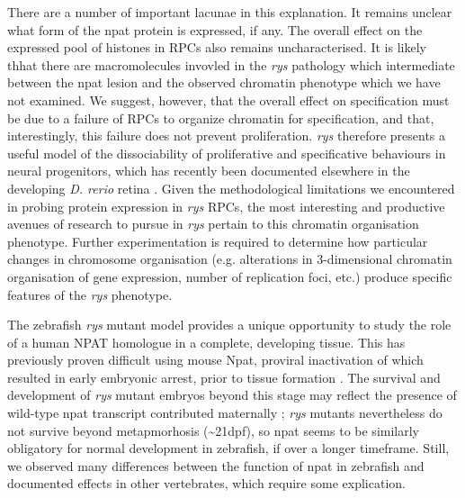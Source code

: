 There are a number of important lacunae in this explanation. It remains unclear what form of the npat protein is expressed, if any. The overall effect on the expressed pool of histones in RPCs also remains uncharacterised. It is likely thhat there are macromolecules invovled in the \textit{rys} pathology which intermediate between the npat lesion and the observed chromatin phenotype which we have not examined. We suggest, however, that the overall effect on specification must be due to a failure of RPCs to organize chromatin for specification, and that, interestingly, this failure does not prevent proliferation. \textit{rys} therefore presents a useful model of the dissociability of proliferative and specificative behaviours in neural progenitors, which has recently been documented elsewhere in the developing \textit{D. rerio} retina \cite{Engerer2017}. Given the methodological limitations we encountered in probing protein expression in \textit{rys} RPCs, the most interesting and productive avenues of research to pursue in \textit{rys} pertain to this chromatin organisation phenotype.  Further experimentation is required to determine how particular changes in chromosome organisation (e.g. alterations in 3-dimensional chromatin organisation of gene expression, number of replication foci, etc.) produce specific features of the \textit{rys} phenotype. 

The zebrafish \textit{rys} mutant model provides a unique opportunity to study the role of a human NPAT homologue in a complete, developing tissue. This has previously proven difficult using mouse Npat, proviral inactivation of which resulted in early embryonic arrest, prior to tissue formation \cite{DiFruscio1997}. The survival and development of \textit{rys} mutant embryos beyond this stage may reflect the presence of wild-type npat transcript contributed maternally \cite{Harvey2013}; \textit{rys} mutants nevertheless do not survive beyond metapmorhosis (\textasciitilde{}21dpf), so npat seems to be similarly obligatory for normal development in zebrafish, if over a longer timeframe. Still, we observed many differences between the function of npat in zebrafish and documented effects in other vertebrates, which require some explication.

